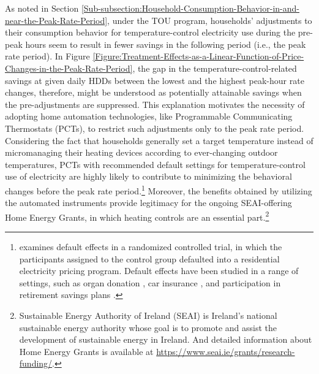 As noted in Section \ref{Sub-subsection:Household-Consumption-Behavior-in-and-near-the-Peak-Rate-Period}, under the TOU program, households' adjustments to their consumption behavior for temperature-control electricity use during the pre-peak hours seem to result in fewer savings in the following period (i.e., the peak rate period). In Figure \ref{Figure:Treatment-Effects-as-a-Linear-Function-of-Price-Changes-in-the-Peak-Rate-Period}, the gap in the temperature-control-related savings at given daily HDDs between the lowest and the highest peak-hour rate changes, therefore, might be understood as potentially attainable savings when the pre-adjustments are suppressed. This explanation motivates the necessity of adopting home automation technologies, like Programmable Communicating Thermostats (PCTs), to restrict such adjustments only to the peak rate period. Considering the fact that households generally set a target temperature instead of micromanaging their heating devices according to ever-changing outdoor temperatures, PCTs with recommended default settings for temperature-control use of electricity are highly likely to contribute to minimizing the behavioral changes before the peak rate period.\footnote{\cite{Default-Effects-and-Follow-on-Behavior_Evidence-from-an-Electricity-Pricing-Program_Fowlie-et-al_2021} examines default effects in a randomized controlled trial, in which the participants assigned to the control group defaulted into a residential electricity pricing program. Default effects have been studied in a range of settings, such as organ donation \citep{Medicine_Do-Defaults-Save-Lives_Johnson-and-Goldstein_2003, The-Impact-of-Presumed-Consent-Legislation-on-Cadaveric-Organ-Donoation_Abadie-and-Gay_2006}, car insurance \citep{Framing-Probability-Distortions-and-Insurance-Decisions_Johnson-et-al_1993}, and participation in retirement savings plans \citep{Status-Quo-Bias-in-Decision-Making_Samuelson-and-Zeckhauser_1988, The-Power-of-Suggestion_Madrian-and-Shea_2001, For-Better-or-For-Worse_Choi-et-al_2019}.} Moreover, the benefits obtained by utilizing the automated instruments provide legitimacy for the ongoing SEAI-offering Home Energy Grants, in which heating controls are an essential part.\footnote{Sustainable Energy Authority of Ireland (SEAI) is Ireland's national sustainable energy authority whose goal is to promote and assist the development of sustainable energy in Ireland. And detailed information about Home Energy Grants is available at \url{https://www.seai.ie/grants/research-funding/}.}  

